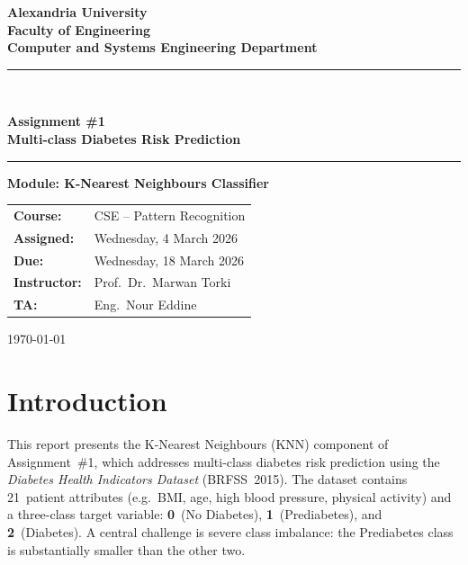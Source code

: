 \documentclass[12pt,a4paper]{article}
\begin{document}
\begin{titlepage}
  \centering
  \vspace*{2cm}
  {\Large\bfseries\color{alexblue} Alexandria University\\[0.3em]
   Faculty of Engineering\\[0.3em]
   Computer and Systems Engineering Department\par}
  \vspace{1.5cm}
  \rule{\linewidth}{1.5pt}\\[0.4em]
  {\LARGE\bfseries Assignment \#1\\[0.4em]
   Multi-class Diabetes Risk Prediction\par}
  \rule{\linewidth}{1.5pt}
  \vspace{1.5cm}
  {\large\bfseries Module: K-Nearest Neighbours Classifier\par}
  \vspace{2cm}
  \begin{tabular}{ll}
    \textbf{Course:}    & CSE -- Pattern Recognition \\[0.4em]
    \textbf{Assigned:}  & Wednesday, 4 March 2026 \\[0.4em]
    \textbf{Due:}       & Wednesday, 18 March 2026 \\[0.4em]
    \textbf{Instructor:}& Prof.\ Dr.\ Marwan Torki \\[0.4em]
    \textbf{TA:}        & Eng.\ Nour Eddine \\
  \end{tabular}
  \vfill
  {\small \today}
\end{titlepage}

\tableofcontents
\newpage

\section{Introduction}

This report presents the K-Nearest Neighbours (KNN) component of Assignment~\#1, which
addresses multi-class diabetes risk prediction using the
\textit{Diabetes Health Indicators Dataset} (BRFSS~2015).  
The dataset contains 21~patient attributes (e.g.\ BMI, age, high blood pressure,
physical activity) and a three-class target variable:
\textbf{0}~(No Diabetes), \textbf{1}~(Prediabetes), and \textbf{2}~(Diabetes).
A central challenge is severe class imbalance: the Prediabetes class is
substantially smaller than the other two.
\end{document}
